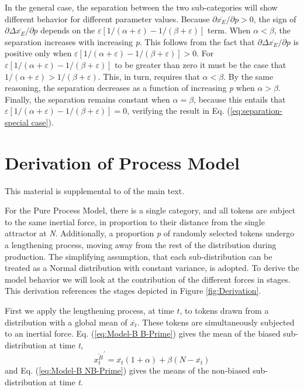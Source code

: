 In the general case, the separation between the two sub-categories
will show different behavior for different parameter values. Because
${\partial\overline{x_{E}}}/{\partial p}>0$, the sign of ${\partial\Delta\overline{x_{E}}}/{\partial p}$
depends on the $\varepsilon[{1}/({\alpha+\varepsilon})-{1}/({\beta+\varepsilon})]$
term. When $\alpha<\beta$, the separation increases with increasing
\emph{p}. This follows from the fact that ${\partial\Delta\overline{x_{E}}}/{\partial p}$
is positive only when $\varepsilon[{1}/({\alpha+\varepsilon})-{1}/({\beta+\varepsilon})]>0$.
For $\varepsilon[{1}/({\alpha+\varepsilon})-{1}/({\beta+\varepsilon})]$
to be greater than zero it must be the case that ${1}/({\alpha+\varepsilon})>{1}/({\beta+\varepsilon})$.
This, in turn, requires that $\alpha<\beta$. By the same reasoning,
the separation decreases as a function of increasing \emph{p} when
$\alpha>\beta$. Finally, the separation remains constant when $\alpha=\beta$,
because this entails that $\varepsilon[{1}/({\alpha+\varepsilon})-{1}/({\beta+\varepsilon})]=0$,
verifying the result in Eq. (\ref{eq:separation-special case}).

\chapter{\label{chap:Appendix D}Derivation of Process Model}

This material is supplemental to 
of the main text.

For the Pure Process Model, there is a single category, and all tokens
are subject to the same inertial force, in proportion to their distance
from the single attractor at \emph{N}. Additionally, a proportion
\emph{p} of randomly selected tokens undergo a lengthening process,
moving away from the rest of the distribution during production. The
simplifying assumption, that each sub-distribution can be treated
as a Normal distribution with constant variance, is adopted. To derive
the model behavior we will look at the contribution of the different
forces in stages. This derivation references the stages depicted in
Figure \ref{fig:Derivation}.

First we apply the lengthening process, at time $t$, to tokens drawn
from a distribution with a global mean of $\overline{x_{t}}$. These
tokens are simultaneously subjected to an inertial force. Eq. (\ref{eq:Model-B B-Prime})
gives the mean of the biased sub-distribution at time \emph{t,}
\begin{equation}
\overline{x_{t}^{B}}^{\prime}=\overline{x_{t}}(1+\alpha)+\beta(N-\overline{x_{t}})\label{eq:Model-B B-Prime}
\end{equation}
and Eq. (\ref{eq:Model-B NB-Prime}) gives the means of the non-biased
sub-distribution at time \emph{t}.

